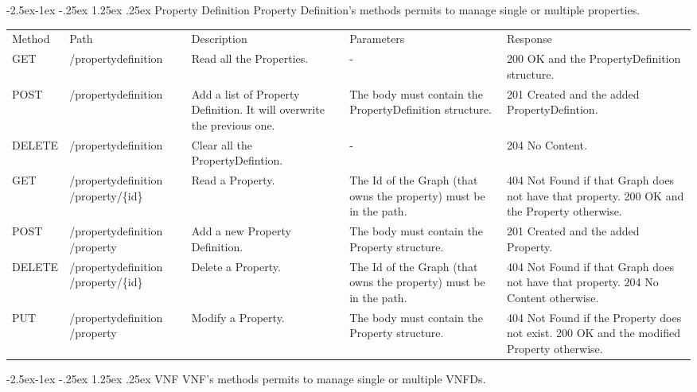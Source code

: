 \documentclass[11pt, english]{article}
\makeatletter
\renewcommand\paragraph{\@startsection{paragraph}{4}{\z@}%
            {-2.5ex\@plus -1ex \@minus -.25ex}%
            {1.25ex \@plus .25ex}%
            {\normalfont\normalsize\bfseries}}
\makeatother
\begin{document}
\newpage
\paragraph{Property Definition}
Property Definition's methods permits to manage single or multiple properties. \\

\begin{tabular}{ |p{2cm}|m{3cm}|p{3cm}|p{3cm}|p{4cm}| }
    \hline
    \rowcolor{black} \multicolumn{5}{|c|}{\textcolor{white}{PropertyDefinition}} \\
    \hline
    \rowcolor{Gray}
    Method & Path & Description & Parameters & Response \\
    \hline
    GET   & /propertydefinition & Read all the Properties. & - & 200 OK and the PropertyDefinition structure. \\
    \hline
    POST & /propertydefinition & Add a list of Property Definition. It will overwrite the previous one. & The body must contain the PropertyDefinition structure. & 201 Created and the added PropertyDefintion. \\
    \hline
    DELETE & /propertydefinition & Clear all the PropertyDefintion. & - & 204 No Content. \\
    \hline
    GET   & /propertydefinition /property/\{id\} & Read a Property. & The Id of the Graph (that owns the property) must be in the path. & 404 Not Found if that Graph does not have that property. 200 OK and the Property otherwise. \\
    \hline
    POST & /propertydefinition /property & Add a new Property Definition. & The body must contain the Property structure. & 201 Created and the added Property. \\
    \hline
    DELETE & /propertydefinition /property/\{id\} & Delete a Property. & The Id of the Graph (that owns the property) must be in the path. & 404 Not Found if that Graph does not have that property. 204 No Content otherwise. \\
    \hline
    PUT & /propertydefinition /property & Modify a Property. & The body must contain the Property structure. & 404 Not Found if the Property does not exist. 200 OK and the modified Property otherwise. \\
    \hline
\end{tabular}

\newpage
\paragraph{VNF}
VNF's methods permits to manage single or multiple VNFDs. \\
\end{document}
